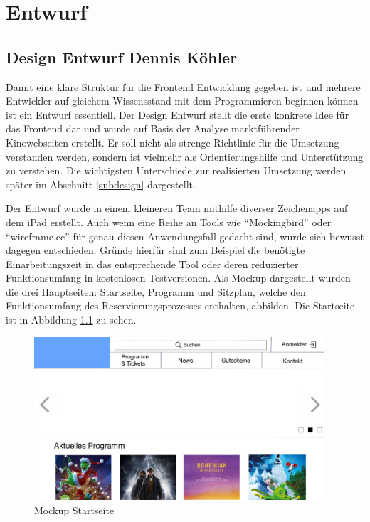 \chapter{Entwurf}\label{entwurf}
	\section[Design Entwurf]{Design Entwurf {\hfill \normalsize Dennis Köhler}}\label{design}
		
		Damit eine klare Struktur für die Frontend Entwicklung gegeben ist und mehrere Entwickler auf gleichem Wissensstand mit dem Programmieren beginnen können ist ein Entwurf essentiell. Der Design Entwurf stellt die erste konkrete Idee für das Frontend dar und wurde auf Basis der Analyse marktführender Kinowebseiten erstellt. Er soll nicht als strenge Richtlinie für die Umsetzung verstanden werden, sondern ist vielmehr als Orientierungshilfe und Unterstützung zu verstehen. Die wichtigsten Unterschiede zur realisierten Umsetzung werden später im Abschnitt \vref{subdesign} dargestellt. 
		
		Der Entwurf wurde in einem kleineren Team mithilfe diverser Zeichenapps auf dem iPad erstellt. Auch wenn eine Reihe an Tools wie \enquote{Mockingbird} oder \enquote{wireframe.cc} für genau diesen Anwendungsfall gedacht sind, wurde sich bewusst dagegen entschieden. Gründe hierfür sind zum Beispiel die benötigte Einarbeitungszeit in das entsprechende Tool oder deren reduzierter Funktionsumfang in kostenlosen Testversionen. 
		Als Mockup dargestellt wurden die drei Hauptseiten: Startseite, Programm und Sitzplan, welche den Funktionsumfang des Reservierungsprozesses enthalten, abbilden. Die Startseite ist in Abbildung \ref{fig:mockUpStartseite} zu sehen.
		
		\begin{figure}[H]
			\centering 
			\includegraphics[width=10.8cm]{img/mockUp1.png}
			\captionsetup{format=hang}
			\caption[Mockup Startseite]{\label{fig:mockUpStartseite} Mockup Startseite }
		\end{figure}
		
